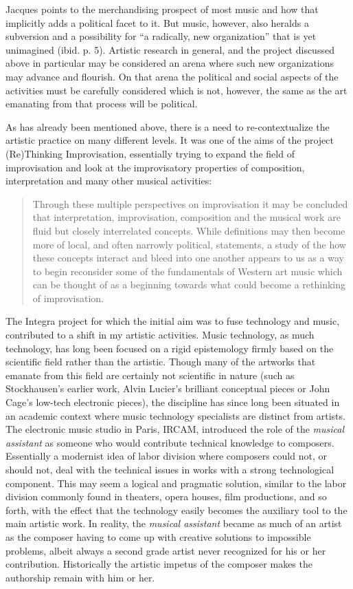 \documentclass[a4paper]{article}
\begin{document}
Jacques \citet{attali85} points to the merchandising prospect of most music and how that implicitly adds a political facet to it. But music, however, also heralds a subversion and a possibility for {\textquotedblleft}a radically, new organization{\textquotedblright} that is yet unimagined (ibid. p. 5). Artistic research in general, and the project discussed above in particular may be considered an arena where such new organizations may advance and flourish. On that arena the political and social aspects of the activities must be carefully considered which is not, however, the same as the art emanating from that process will be political.

As has already been mentioned above, there is a need to re-contextualize the artistic practice on many different levels. It was one of the aims of the project (Re)Thinking Improvisation, essentially trying to expand the field of improvisation and look at the improvisatory properties of composition, interpretation and many other musical activities:

\begin{quote}
  Through these multiple perspectives on improvisation it may be
  concluded that interpretation, improvisation, composition and the
  musical work are fluid but closely interrelated concepts. While
  definitions may then become more of local, and often narrowly
  political, statements, a study of the how these concepts interact
  and bleed into one another appears to us as a way to begin
  reconsider some of the fundamentals of Western art music which can
  be thought of as a beginning towards what could become a rethinking
  of improvisation. \citep{frisk-re_improv13}
\end{quote}

The Integra project for which the initial aim was to fuse technology and music, contributed to a shift in my artistic activities. Music technology, as much technology, has long been focused on a rigid epistemology firmly based on the scientific field rather than the artistic. Though many of the artworks that emanate from this field are certainly not scientific in nature (such as Stockhausen's earlier work, Alvin Lucier's brilliant conceptual pieces or John Cage's low-tech electronic pieces), the discipline has since long been situated in an academic context where music technology specialists are distinct from artists. The electronic music studio in Paris, IRCAM, introduced the role of the \emph{musical assistant} as someone who would contribute technical knowledge to composers. Essentially a modernist idea of labor division where composers could not, or should not, deal with the technical issues in works with a strong technological component. This may seem a logical and pragmatic solution, similar to the labor division commonly found in theaters, opera houses, film productions, and so forth, with the effect that the technology easily becomes the auxiliary tool to the main artistic work. In reality, the \emph{musical assistant} became as much of an artist as the composer having to come up with creative solutions to impossible problems, albeit always a second grade artist never recognized for his or her contribution. Historically the artistic impetus of the composer makes the authorship remain with him or her.
\end{document}
